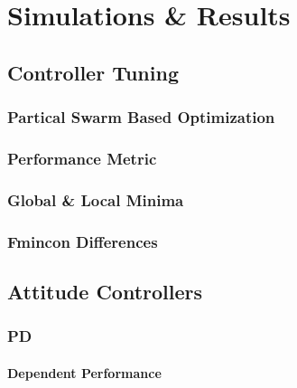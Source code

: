 \chapter{Simulations \& Results}
\label{ch:simulation}
\section{Controller Tuning}
\label{sec:simulation.tuning}
\subsection{Partical Swarm Based Optimization}
\label{subsec:simulation.tuning.pso}
\subsection{Performance Metric}
\label{subsec:simulation.tuning.metric}
\subsection{Global \& Local Minima}
\subsection{Fmincon Differences}
\section{Attitude Controllers}
\subsection{PD}
\label{subsec:simulation.attitude.pd}
\subsubsection{Dependent Performance}
\label{subsubsec:simulation.atttiude.pd.dependent}

